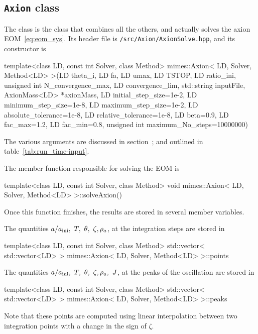 \documentclass[11pt,a4paper]{article}
\begin{document}
\subsection{{\tt Axion} class}
%
The  class is the class that combines all the others, and actually solves the axion EOM~\ref{eq:eom_sys}. Its header file is {\tt \mimes/src/Axion/AxionSolve.hpp}, and its constructor is
%
\begin{cpp}
 	template<class LD, const int Solver, class Method>
	mimes::Axion< LD, Solver, Method<LD> >(LD theta_i, LD fa, LD umax, LD TSTOP, 
	LD ratio_ini, unsigned int N_convergence_max, LD convergence_lim, 
	std::string inputFile, AxionMass<LD> *axionMass, LD initial_step_size=1e-2, 
	LD minimum_step_size=1e-8, LD maximum_step_size=1e-2, LD absolute_tolerance=1e-8, 
	LD relative_tolerance=1e-8, LD beta=0.9, LD fac_max=1.2, LD fac_min=0.8, 
	unsigned int maximum_No_steps=10000000)
\end{cpp}
%
The various arguments are discussed in section~; and outlined in table~\ref{tab:run_time-input}.
%

The member function responsible for solving the EOM is
%
\begin{cpp}
	template<class LD, const int Solver, class Method>
	void mimes::Axion< LD, Solver, Method<LD> >::solveAxion()
\end{cpp}
%
Once this function finishes, the results are stored in several member variables.

The quantities $a/\ai, \ T, \ \theta, \ \zeta, \rho_a$, at the integration  steps are stored in
%
\begin{cpp}
	template<class LD, const int Solver, class Method> 
	std::vector< std::vector<LD> > mimes::Axion< LD, Solver, Method<LD> >::points
\end{cpp}
%

The quantities $a/\ai, \ T, \ \theta, \ \zeta, \rho_a, \ J$, at the peaks of the oscillation are stored in 
%
\begin{cpp}
	template<class LD, const int Solver, class Method> 
	std::vector< std::vector<LD> > mimes::Axion< LD, Solver, Method<LD> >::peaks
\end{cpp}
%
Note that these points are computed using linear interpolation between two integration points with a change in the sign of $\zeta$.
\end{document}
